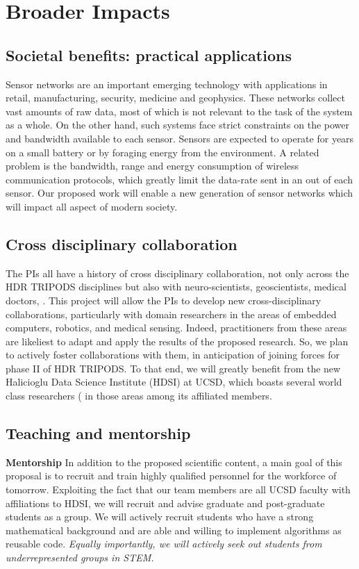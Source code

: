 \section{Broader Impacts}
\subsection*{Societal benefits: practical applications}
Sensor networks are an important emerging technology with applications
in retail, manufacturing, security, medicine and geophysics. These networks
collect vast amounts of raw data, most of which is not relevant to the
task of the system as a whole. On the other hand, such systems face strict constraints on the power and bandwidth available to each sensor.
Sensors are expected to operate for years on a small battery or by
foraging energy from the environment. A related problem is the
bandwidth, range and energy consumption of wireless communication
protocols, which greatly limit the data-rate sent in an out of each
sensor. Our proposed work
will enable a new generation of sensor networks which will impact all
aspect of modern society.
\subsection*{Cross disciplinary collaboration}
The PIs all have a history of cross disciplinary collaboration, not only across the HDR TRIPODS disciplines but also with neuro-scientists, geoscientists, medical doctors, . This project will allow the PIs to develop new cross-disciplinary collaborations, particularly with domain researchers in the areas of embedded computers, robotics, and medical sensing. Indeed, practitioners from these areas are likeliest to adapt and apply the results of the proposed research. So, we plan to actively foster collaborations with them, in anticipation of joining forces for phase II of HDR TRIPODS. To that end, we will greatly benefit from the new Halicioglu Data Science Institute (HDSI) at UCSD, which boasts several world class researchers ( in those areas among its affiliated members. 
\subsection*{Teaching and mentorship}
{\bf Mentorship} In addition to the proposed scientific content, a main goal of this proposal is to recruit and train highly qualified personnel for the workforce of tomorrow. Exploiting the fact that our team members are all UCSD faculty with affiliations to HDSI, we will recruit and advise graduate and post-graduate students as a
group. We will actively recruit students who have a strong
mathematical background and are able and willing to implement
algorithms as reusable code. \emph{Equally importantly, we will actively seek out students from underrepresented groups in STEM.}

